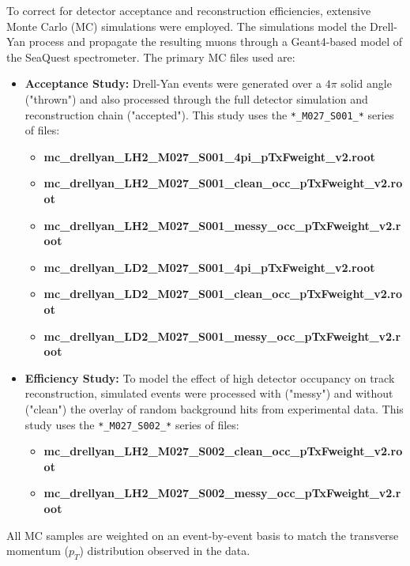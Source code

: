 \documentclass[11pt]{article}
\begin{document}
To correct for detector acceptance and reconstruction efficiencies, extensive Monte Carlo (MC) simulations were employed. The simulations model the Drell-Yan process and propagate the resulting muons through a Geant4-based model of the SeaQuest spectrometer. The primary MC files used are:
\begin{itemize}
    \item \textbf{Acceptance Study:} Drell-Yan events were generated over a $4\pi$ solid angle ("thrown") and also processed through the full detector simulation and reconstruction chain ("accepted"). This study uses the \texttt{*\_M027\_S001\_*} series of files:
    \begin{itemize}
        \item \textbf{mc\_drellyan\_LH2\_M027\_S001\_4pi\_pTxFweight\_v2.root}
	    \item \textbf{mc\_drellyan\_LH2\_M027\_S001\_clean\_occ\_pTxFweight\_v2.root}
	    \item \textbf{mc\_drellyan\_LH2\_M027\_S001\_messy\_occ\_pTxFweight\_v2.root}
        \item \textbf{mc\_drellyan\_LD2\_M027\_S001\_4pi\_pTxFweight\_v2.root}
        \item \textbf{mc\_drellyan\_LD2\_M027\_S001\_clean\_occ\_pTxFweight\_v2.root}
        \item \textbf{mc\_drellyan\_LD2\_M027\_S001\_messy\_occ\_pTxFweight\_v2.root}
    \end{itemize}
    \item \textbf{Efficiency Study:} To model the effect of high detector occupancy on track reconstruction, simulated events were processed with ("messy") and without ("clean") the overlay of random background hits from experimental data. This study uses the \texttt{*\_M027\_S002\_*} series of files:
    \begin{itemize}
        \item \textbf{mc\_drellyan\_LH2\_M027\_S002\_clean\_occ\_pTxFweight\_v2.root}
        \item \textbf{mc\_drellyan\_LH2\_M027\_S002\_messy\_occ\_pTxFweight\_v2.root}    
    \end{itemize}
\end{itemize}
All MC samples are weighted on an event-by-event basis to match the transverse momentum ($p_T$) distribution observed in the data.
\end{document}
